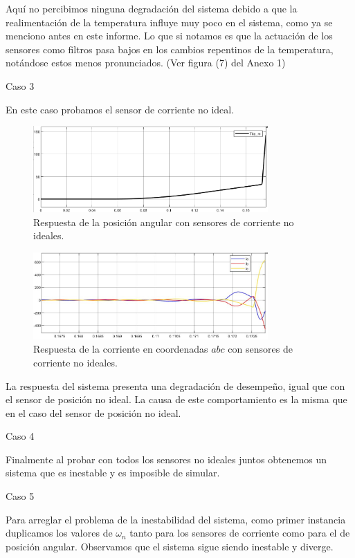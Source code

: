 \documentclass{article}
\begin{document}
Aquí no percibimos ninguna degradación del sistema debido a que la realimentación de la temperatura 
influye muy poco en el sistema, como ya se menciono antes en este informe. Lo que si notamos es que
la actuación de los sensores como filtros pasa bajos en los cambios repentinos de la temperatura, 
notándose estos menos pronunciados. (Ver figura (7) del Anexo 1)

\bullet Caso 3

En este caso probamos el sensor de corriente no ideal.

\begin{figure}[H]
    \centering
    \includegraphics[width=0.8\textwidth]{5.2.5.d.4.png}
    \caption{Respuesta de la posición angular con sensores de corriente no ideales.}
\end{figure}

\begin{figure}[H]
    \centering
    \includegraphics[width=0.8\textwidth]{5.2.5.d.5.png}
    \caption{Respuesta de la corriente en coordenadas $abc$ con sensores de corriente no ideales.}
\end{figure}

La respuesta del sistema presenta una degradación de desempeño, igual que con el 
sensor de posición no ideal. La causa de este comportamiento es la misma que en el caso del sensor de
posición no ideal. 

\bullet Caso 4

Finalmente al probar con todos los sensores no ideales juntos obtenemos un sistema que es inestable y es 
imposible de simular.

\bullet Caso 5

Para arreglar el problema de la inestabilidad del sistema, como primer instancia duplicamos los valores 
de $\omega_n$ tanto para los sensores de corriente como para el de posición angular. Observamos que el 
sistema sigue siendo inestable y diverge.
\end{document}
